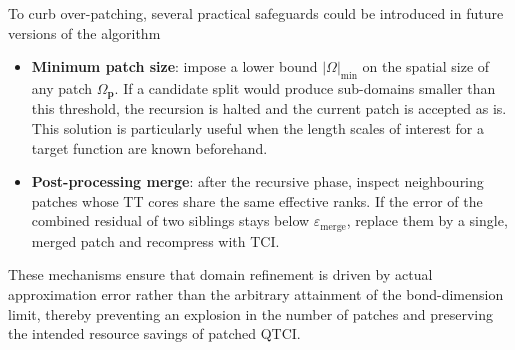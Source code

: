 To curb over-patching, several practical safeguards could be introduced in future versions of the algorithm
%
\begin{itemize}
  	\item \textbf{Minimum patch size}: impose a lower bound $|\Omega|_{\min}$ on the spatial size of any patch $\Omega_{\mathbf p}$. If a candidate split would produce sub-domains smaller than this threshold, the recursion is halted and the current patch is accepted as is. This solution is particularly useful when the length scales of interest for a target function are known beforehand.
  \item \textbf{Post-processing merge}: after the recursive phase, inspect neighbouring patches whose TT cores share the same effective ranks.  If the error of the combined residual of two siblings stays below $\varepsilon_{\text{merge}}$, replace them by a single, merged patch and recompress with TCI.
\end{itemize}

These mechanisms ensure that domain refinement is driven by actual approximation error rather than the arbitrary attainment of the bond-dimension limit, thereby preventing an explosion in the number of patches and preserving the intended resource savings of patched QTCI.